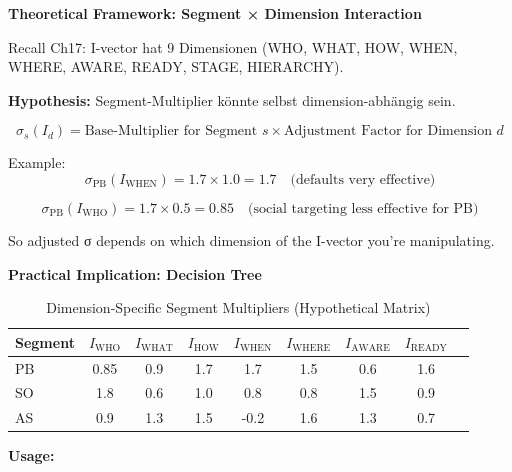 \textbf{Theoretical Framework: Segment × Dimension Interaction}

Recall Ch17: I-vector hat 9 Dimensionen (WHO, WHAT, HOW, WHEN, WHERE, AWARE, READY, STAGE, HIERARCHY).

\textbf{Hypothesis:} Segment-Multiplier könnte selbst dimension-abhängig sein.

\begin{definition}
\label{def:19-sigma-dimensional}

\begin{equation}
\sigma_s(I_d) = \text{Base-Multiplier for Segment } s \times \text{Adjustment Factor for Dimension } d
\label{eq:19-sigma-dimensional}
\end{equation}

Example:
\begin{equation}
\sigma_{\text{PB}}(I_{\text{WHEN}}) = 1.7 \times 1.0 = 1.7 \quad \text{(defaults very effective)}
\end{equation}

\begin{equation}
\sigma_{\text{PB}}(I_{\text{WHO}}) = 1.7 \times 0.5 = 0.85 \quad \text{(social targeting less effective for PB)}
\end{equation}

So adjusted σ depends on which dimension of the I-vector you're manipulating.

\end{definition}

\textbf{Practical Implication: Decision Tree}

\begin{table}[htbp]
\centering
\caption{Dimension-Specific Segment Multipliers (Hypothetical Matrix)}
\label{tab:19-sigma-by-dimension}
\renewcommand{\arraystretch}{1.3}
\footnotesize
\begin{tabular}{@{}lcccccccc@{}}
\toprule
\textbf{Segment} & $I_{\text{WHO}}$ & $I_{\text{WHAT}}$ & $I_{\text{HOW}}$ & $I_{\text{WHEN}}$ & $I_{\text{WHERE}}$ & $I_{\text{AWARE}}$ & $I_{\text{READY}}$ \\
\midrule
PB & 0.85 & 0.9 & 1.7 & 1.7 & 1.5 & 0.6 & 1.6 \\
SO & 1.8 & 0.6 & 1.0 & 0.8 & 0.8 & 1.5 & 0.9 \\
AS & 0.9 & 1.3 & 1.5 & -0.2 & 1.6 & 1.3 & 0.7 \\
\bottomrule
\end{tabular}
\end{table}

\textbf{Usage:}

